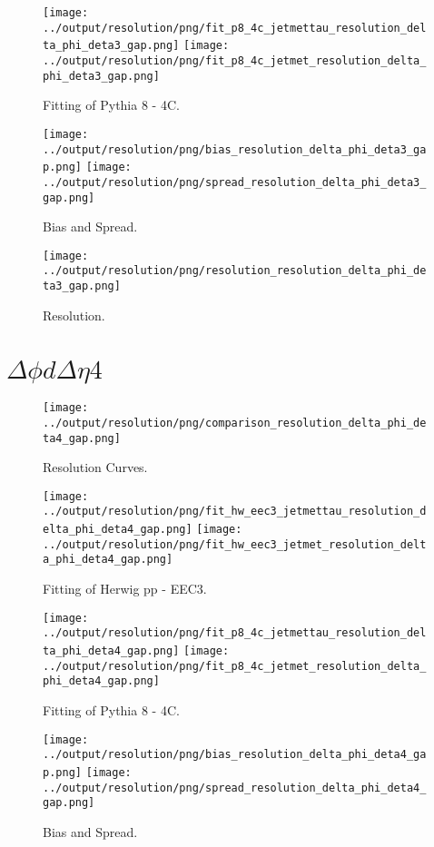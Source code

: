 \documentclass[11pt]{book}
\begin{document}
\begin{figure}[ht]
\centering
\texttt{[image: ../output/resolution/png/fit\_p8\_4c\_jetmettau\_resolution\_delta\_phi\_deta3\_gap.png]}
\texttt{[image: ../output/resolution/png/fit\_p8\_4c\_jetmet\_resolution\_delta\_phi\_deta3\_gap.png]}
\caption{Fitting of Pythia 8 - 4C.}
\end{figure}

\begin{figure}[ht]
\centering
\texttt{[image: ../output/resolution/png/bias\_resolution\_delta\_phi\_deta3\_gap.png]}
\texttt{[image: ../output/resolution/png/spread\_resolution\_delta\_phi\_deta3\_gap.png]}
\caption{Bias and Spread.}
\end{figure}


\begin{figure}[ht]
\centering
\texttt{[image: ../output/resolution/png/resolution\_resolution\_delta\_phi\_deta3\_gap.png]}
\caption{Resolution.}
\end{figure}
\clearpage

\section{$\Delta\phi d\Delta\eta 4$}

\begin{figure}[ht]
\centering
\texttt{[image: ../output/resolution/png/comparison\_resolution\_delta\_phi\_deta4\_gap.png]}
\caption{Resolution Curves.}
\end{figure}


\begin{figure}[ht]
\centering
\texttt{[image: ../output/resolution/png/fit\_hw\_eec3\_jetmettau\_resolution\_delta\_phi\_deta4\_gap.png]}
\texttt{[image: ../output/resolution/png/fit\_hw\_eec3\_jetmet\_resolution\_delta\_phi\_deta4\_gap.png]}
\caption{Fitting of Herwig pp - EEC3.}
\end{figure}

\begin{figure}[ht]
\centering
\texttt{[image: ../output/resolution/png/fit\_p8\_4c\_jetmettau\_resolution\_delta\_phi\_deta4\_gap.png]}
\texttt{[image: ../output/resolution/png/fit\_p8\_4c\_jetmet\_resolution\_delta\_phi\_deta4\_gap.png]}
\caption{Fitting of Pythia 8 - 4C.}
\end{figure}

\begin{figure}[ht]
\centering
\texttt{[image: ../output/resolution/png/bias\_resolution\_delta\_phi\_deta4\_gap.png]}
\texttt{[image: ../output/resolution/png/spread\_resolution\_delta\_phi\_deta4\_gap.png]}
\caption{Bias and Spread.}
\end{figure}
\end{document}
